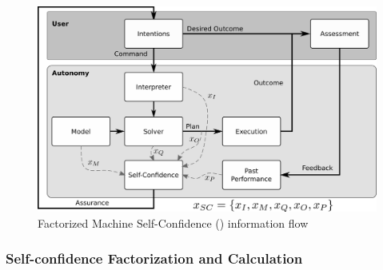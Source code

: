     \begin{figure}[tbp]
        \centering
        \includegraphics[width=0.7\linewidth]{Figures/FaMSeC.png}
        \caption{Factorized Machine Self-Confidence (\famsec) information flow}
        \label{fig:famsec}
    \end{figure}
    
\subsubsection{Self-confidence Factorization and Calculation} \label{sec:self-confidence}

